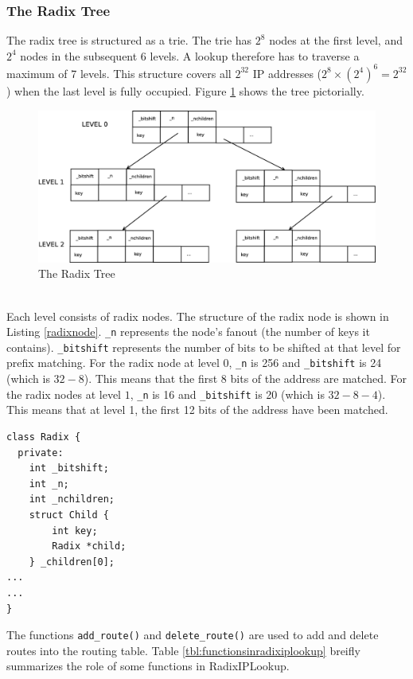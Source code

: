 \documentclass[a4paper]{article}
\begin{document}
\subsubsection{The Radix Tree}
The radix tree is structured as a trie. The trie has  $2^8$ nodes at the first level, and $2^4$ nodes in the subsequent 6 levels. A lookup therefore has to traverse a maximum of 7 levels. This structure covers all $2^{32}$ IP addresses ($2^8\times(2^4)^6=2^{32}$) when the last level is fully occupied. Figure \ref{radixtree} shows the tree pictorially.\\
\begin{figure}[tph]
\begin{center}
\includegraphics[scale = 0.23]{../images/diagrams/radixtree2.eps}
\caption{The Radix Tree}
\label{radixtree}
\end{center}
\end{figure}
\\Each level consists of radix nodes. The structure of the radix node is shown in Listing \ref{radixnode}. \verb+_n+ represents the node's fanout (the number of keys it contains). \verb+_bitshift+ represents the number of bits to be shifted at that level for prefix matching. For the radix node at level 0, \verb+_n+ is 256 and \verb+_bitshift+ is 24 (which is $32 - 8$). This means that the first 8 bits of the address are matched. For the radix nodes at level $1$, \verb+_n+ is 16 and \verb+_bitshift+ is 20 (which is $32 -8 -4$). This means that at level 1, the first 12 bits of the address have been matched.
\begin{lstlisting}[float=tph, caption = The Radix Class, label=radixnode]
class Radix {
  private:
    int _bitshift;
    int _n;
    int _nchildren;
    struct Child {
        int key;
        Radix *child;
    } _children[0];
...
...
}
\end{lstlisting}
The functions \verb+add_route()+ and \verb+delete_route()+ are used to add and delete routes into the routing table. Table \ref{tbl:functionsinradixiplookup} breifly summarizes the role of some functions in RadixIPLookup.
\end{document}
